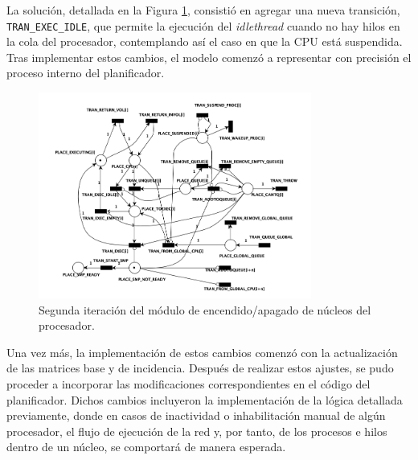 La solución, detallada en la Figura \ref{fig:cpu-on-off-2nd-iteration}, consistió en agregar una nueva transición, \texttt{TRAN\_EXEC\_IDLE}, que permite la ejecución del \textit{idlethread} cuando no hay hilos en la cola del procesador, contemplando así el caso en que la CPU está suspendida. Tras implementar estos cambios, el modelo comenzó a representar con precisión el proceso interno del planificador.\par

\begin{figure}[H]
    \centering
    \vspace*{0.1in}
    \includegraphics[width=0.8\textwidth]{./images/cpuOnOff-2nd-iteration.png}
    \caption{Segunda iteración del módulo de encendido/apagado de núcleos del procesador.}
    \label{fig:cpu-on-off-2nd-iteration}
\end{figure}

Una vez más, la implementación de estos cambios comenzó con la actualización de las matrices base y de incidencia. Después de realizar estos ajustes, se pudo proceder a incorporar las modificaciones correspondientes en el código del planificador. Dichos cambios incluyeron la implementación de la lógica detallada previamente, donde en casos de inactividad o inhabilitación manual de algún procesador, el flujo de ejecución de la red y, por tanto, de los procesos e hilos dentro de un núcleo, se comportará de manera esperada.\par


